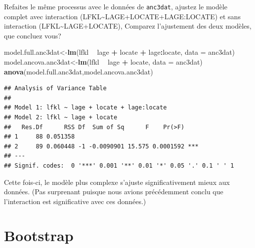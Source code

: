 \documentclass[12pt,]{book}
\makeatletter
\newenvironment{Shaded}{\begin{snugshade}}{\end{snugshade}}
\newcommand{\DataTypeTok}[1]{\textcolor[rgb]{0.13,0.29,0.53}{#1}}
\newcommand{\KeywordTok}[1]{\textcolor[rgb]{0.13,0.29,0.53}{\textbf{#1}}}
\newcommand{\NormalTok}[1]{#1}
\newcommand{\OperatorTok}[1]{\textcolor[rgb]{0.81,0.36,0.00}{\textbf{#1}}}
\newcommand{\StringTok}[1]{\textcolor[rgb]{0.31,0.60,0.02}{#1}}
\newenvironment{kframe}{%
\medskip{}
\setlength{\fboxsep}{.8em}
\def\at@end@of@kframe{}%
\ifinner\ifhmode%
 \def\at@end@of@kframe{\end{minipage}}%
 \begin{minipage}{\columnwidth}%
\fi\fi%
\def\FrameCommand##1{\hskip\@totalleftmargin \hskip-\fboxsep
\colorbox{incolor}{##1}\hskip-\fboxsep
    \hskip-\linewidth \hskip-\@totalleftmargin \hskip\columnwidth}%
\MakeFramed {\advance\hsize-\width
  \@totalleftmargin\z@ \linewidth\hsize
  \@setminipage}}%
{\par\unskip\endMakeFramed%
\at@end@of@kframe}
\newenvironment{rmdblock}[1]
 {
 \begin{itemize}
 \renewcommand{\labelitemi}{
   \raisebox{-.7\height}[0pt][0pt]{
     {\setkeys{Gin}{width=3em,keepaspectratio}\texttt{[image: images/\#1]}}
   }
 }
 \begin{kframe}
 \setlength{\fboxsep}{1em}
 \item
 }
 {
 \end{kframe}
 \end{itemize}
 }
\newenvironment{rmdcode}
  {\begin{rmdblock}{screen}}
  {\end{rmdblock}}
\makeatother
\begin{document}
\begin{rmdcode}
Refaites le même processus avec le données de \texttt{anc3dat}, ajustez le modèle complet avec interaction (LFKL\textasciitilde{}LAGE+LOCATE+LAGE:LOCATE) et sans interaction (LFKL\textasciitilde{}LAGE+LOCATE), Comparez l'ajustement des deux modèles, que concluez vous?
\end{rmdcode}

\begin{Shaded}
\begin{Highlighting}[]
\NormalTok{model.full.anc3dat<-}\KeywordTok{lm}\NormalTok{(lfkl }\OperatorTok{~}\StringTok{ }\NormalTok{lage }\OperatorTok{+}\StringTok{ }\NormalTok{locate }\OperatorTok{+}\StringTok{ }\NormalTok{lage}\OperatorTok{:}\NormalTok{locate, }\DataTypeTok{data =}\NormalTok{ anc3dat)}
\NormalTok{model.ancova.anc3dat<-}\KeywordTok{lm}\NormalTok{(lfkl }\OperatorTok{~}\StringTok{ }\NormalTok{lage }\OperatorTok{+}\StringTok{ }\NormalTok{locate, }\DataTypeTok{data =}\NormalTok{ anc3dat)}
\KeywordTok{anova}\NormalTok{(model.full.anc3dat,model.ancova.anc3dat)}
\end{Highlighting}
\end{Shaded}

\begin{verbatim}
## Analysis of Variance Table
## 
## Model 1: lfkl ~ lage + locate + lage:locate
## Model 2: lfkl ~ lage + locate
##   Res.Df      RSS Df  Sum of Sq      F    Pr(>F)    
## 1     88 0.051358                                   
## 2     89 0.060448 -1 -0.0090901 15.575 0.0001592 ***
## ---
## Signif. codes:  0 '***' 0.001 '**' 0.01 '*' 0.05 '.' 0.1 ' ' 1
\end{verbatim}

Cette fois-ci, le modèle plus complexe s'ajuste significativement mieux aux données. (Pas surprenant puisque nous avions précédemment conclu que l'interaction est significative avec ces données.)

\hypertarget{bootstrap-1}{%
\section{Bootstrap}\label{bootstrap-1}}
\end{document}
